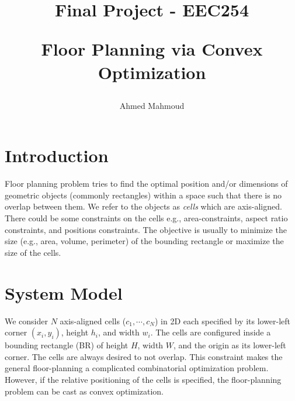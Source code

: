 \documentclass[12pt] {article}
\begin{document}

\title{
Final Project -  EEC254 \\
\begin{large}
Floor Planning via Convex Optimization
\end{large}
}
\author{Ahmed Mahmoud}
\date{}
\maketitle



\section{Introduction}
Floor planning problem tries to find the optimal position and/or dimensions of geometric objects (commonly rectangles) within a space such that there is no overlap between them. We refer to the objects as \emph{cells} which are axis-aligned. There could be some constraints on the cells e.g., area-constraints, aspect ratio constraints, and positions constraints. The objective is usually to minimize the size (e.g., area, volume, perimeter) of the bounding rectangle or maximize the size of the cells.

\section{System Model}
We consider $N$ axis-aligned cells ($c_{1}, \cdots, c_{N}$) in 2D each specified by its lower-left corner $(x_{i}, y_{i})$, height $h_{i}$, and width $w_{i}$. The cells are configured inside a bounding rectangle (BR) of height $H$, width $W$, and the origin as its lower-left corner. The cells are always desired to not overlap. This constraint makes the general floor-planning a complicated combinatorial optimization problem. However, if the relative positioning of the cells is specified, the floor-planning problem can be cast as convex optimization. 
\end{document}
